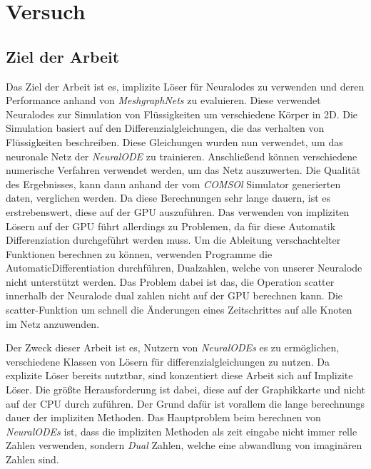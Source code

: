 



\chapter{Versuch}

\section{Ziel der Arbeit}


Das Ziel der Arbeit ist es, implizite Löser für Neuralodes zu verwenden 
und deren Performance anhand von \textit{MeshgraphNets} zu evaluieren. 
Diese verwendet Neuralodes zur Simulation von Flüssigkeiten um verschiedene Körper in 2D.
Die Simulation basiert auf den Differenzialgleichungen, die das verhalten von Flüssigkeiten beschreiben.
Diese Gleichungen wurden nun verwendet, um das neuronale Netz der \textit{NeuralODE} zu trainieren.
Anschließend können verschiedene numerische Verfahren verwendet werden, um das Netz auszuwerten.
Die Qualität des Ergebnisses, kann dann anhand der vom \textit{COMSOl} \cite{} Simulator generierten daten,
verglichen werden.
Da diese Berechnungen sehr lange dauern, ist es erstrebenswert, diese auf der GPU auszuführen.
Das verwenden von impliziten Lösern auf der GPU führt allerdings zu Problemen, da für diese Automatik Differenziation durchgeführt werden muss.
Um die Ableitung verschachtelter Funktionen berechnen zu können, verwenden
Programme die AutomaticDifferentiation durchführen, Dualzahlen, welche von unserer Neuralode nicht unterstützt werden.
Das Problem dabei ist das, die Operation scatter innerhalb der Neuralode dual zahlen nicht auf der GPU 
berechnen kann.
Die scatter-Funktion um schnell die Änderungen eines Zeitschrittes auf alle Knoten im Netz anzuwenden. %


Der Zweck dieser Arbeit ist es, Nutzern von \textit{NeuralODEs} es zu ermöglichen, verschiedene Klassen von Lösern für differenzialgleichungen zu nutzen.
Da explizite Löser bereits nutztbar, sind konzentiert diese Arbeit sich auf Implizite Löser. 
Die größte Herausforderung ist dabei, diese auf der Graphikkarte und nicht auf der CPU durch zuführen.
Der Grund dafür ist vorallem die lange berechnungs dauer der impliziten Methoden.
Das Hauptproblem beim berechnen von \textit{NeuralODEs} ist, dass die impliziten Methoden als zeit eingabe nicht immer relle Zahlen verwenden,
sondern \textit{Dual} Zahlen, welche eine abwandlung von imaginären Zahlen sind.

